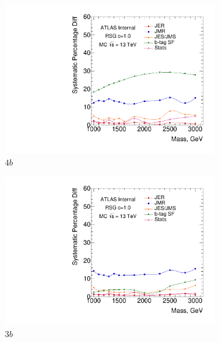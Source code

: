 \begin{figure}[htb!]
\centering
\captionsetup{justification=centering}
    \begin{subfigure}[b]{0.45\textwidth}
        \includegraphics[width=\textwidth,angle=-90]{figures/boosted/Syst_MC/FourTag_RSG_syst.pdf}
        \caption{$4b$}
        \label{fig:signal_syst_summary-4b}
    \end{subfigure}
    \quad 
    \begin{subfigure}[b]{0.45\textwidth}
        \includegraphics[width=\textwidth,angle=-90]{figures/boosted/Syst_MC/ThreeTag_RSG_syst.pdf}
        \caption{$3b$}
        \label{fig:signal_syst_summary-3b}
    \end{subfigure}
    \\
    \begin{subfigure}[b]{0.45\textwidth}

\end{subfigure}
\end{figure}
